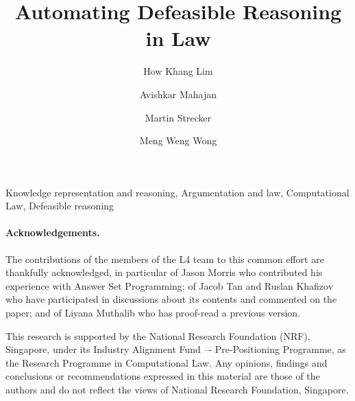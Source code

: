 \documentclass{tlp}
\begin{document}
\title{Automating Defeasible Reasoning in Law}

\begin{authgrp}
\author{ }
\author{ }
\end{authgrp}

\author{How Khang Lim \and
  Avishkar Mahajan \and
  Martin Strecker \and
  Meng Weng Wong
  }
\maketitle

\begin{abstract}

\end{abstract}

\begin{keywords}
  Knowledge representation and reasoning,
  Argumentation and law,
  Computational Law,
  Defeasible reasoning
\end{keywords}


% 

% 

% 

% 

% 

% 

\paragraph{Acknowledgements.}
The contributions of the members of the L4 team to this common effort are
thankfully acknowledged, in particular of Jason Morris who contributed his
experience with Answer Set Programming; of Jacob Tan and Ruslan Khafizov who
have participated in discussions about its contents and commented on the
paper; and of Liyana Muthalib who has proof-read a previous version.

This research is supported by the National Research Foundation (NRF),
Singapore, under its Industry Alignment Fund –- Pre-Positioning Programme, as
the Research Programme in Computational Law. Any opinions, findings and
conclusions or recommendations expressed in this material are those of the
authors and do not reflect the views of National Research Foundation,
Singapore.


% 
% 


\newpage
\appendix




\end{document}
